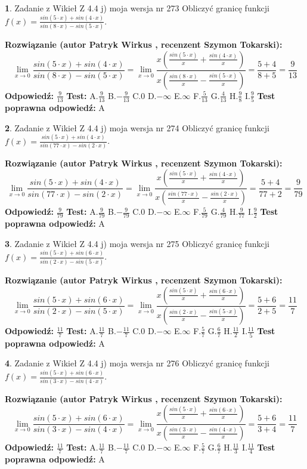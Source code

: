 \documentclass[12pt, a4paper]{article}
\theoremstyle{definition} %
\newtheorem{zad}{}
\newcommand{\zadStart}[1]{\begin{zad}#1\newline}
\newcommand{\zadStop}{\end{zad}}
\newcommand{\rozwStart}[2]{\noindent \textbf{Rozwiązanie (autor #1 , recenzent #2): }\newline}
\newcommand{\rozwStop}{\newline}
\newcommand{\odpStart}{\noindent \textbf{Odpowiedź:}\newline}
\newcommand{\odpStop}{\newline}
\newcommand{\testStart}{\noindent \textbf{Test:}\newline}
\newcommand{\testStop}{\newline}
\newcommand{\kluczStart}{\noindent \textbf{Test poprawna odpowiedź:}\newline}
\newcommand{\kluczStop}{\newline}
\begin{document}
\zadStart{Zadanie z Wikieł Z 4.4 j) moja wersja nr 273}
Obliczyć granicę funkcji $f(x)=\frac{sin(5\cdot x) +sin(4\cdot x)}{sin(8\cdot x) -sin(5\cdot x)}$.
\zadStop
\rozwStart{Patryk Wirkus}{Szymon Tokarski}
$$\lim\limits_{x\to 0}\frac{sin(5\cdot x) +sin(4\cdot x)}{sin(8\cdot x) -sin(5\cdot x)}=\lim\limits_{x\to 0}\frac{x(\frac{sin(5\cdot x)}{x}+\frac{sin(4\cdot x)}{x})}{x(\frac{sin(8\cdot x)}{x}-\frac{sin(5\cdot x)}{x})}=\frac{5+4}{8+5} = \frac{9}{13}$$
\rozwStop
\odpStart
$\frac{9}{13}$
\odpStop
\testStart
A.$\frac{9}{13}$
B.$-\frac{9}{13}$
C.$0$
D.$-\infty$
E.$\infty$
F.$\frac{5}{13}$
G.$\frac{4}{13}$
H.$\frac{9}{8}$
I.$\frac{9}{5}$
\testStop
\kluczStart
A
\kluczStop



\zadStart{Zadanie z Wikieł Z 4.4 j) moja wersja nr 274}
Obliczyć granicę funkcji $f(x)=\frac{sin(5\cdot x) +sin(4\cdot x)}{sin(77\cdot x) -sin(2\cdot x)}$.
\zadStop
\rozwStart{Patryk Wirkus}{Szymon Tokarski}
$$\lim\limits_{x\to 0}\frac{sin(5\cdot x) +sin(4\cdot x)}{sin(77\cdot x) -sin(2\cdot x)}=\lim\limits_{x\to 0}\frac{x(\frac{sin(5\cdot x)}{x}+\frac{sin(4\cdot x)}{x})}{x(\frac{sin(77\cdot x)}{x}-\frac{sin(2\cdot x)}{x})}=\frac{5+4}{77+2} = \frac{9}{79}$$
\rozwStop
\odpStart
$\frac{9}{79}$
\odpStop
\testStart
A.$\frac{9}{79}$
B.$-\frac{9}{79}$
C.$0$
D.$-\infty$
E.$\infty$
F.$\frac{5}{79}$
G.$\frac{4}{79}$
H.$\frac{9}{77}$
I.$\frac{9}{2}$
\testStop
\kluczStart
A
\kluczStop



\zadStart{Zadanie z Wikieł Z 4.4 j) moja wersja nr 275}
Obliczyć granicę funkcji $f(x)=\frac{sin(5\cdot x) +sin(6\cdot x)}{sin(2\cdot x) -sin(5\cdot x)}$.
\zadStop
\rozwStart{Patryk Wirkus}{Szymon Tokarski}
$$\lim\limits_{x\to 0}\frac{sin(5\cdot x) +sin(6\cdot x)}{sin(2\cdot x) -sin(5\cdot x)}=\lim\limits_{x\to 0}\frac{x(\frac{sin(5\cdot x)}{x}+\frac{sin(6\cdot x)}{x})}{x(\frac{sin(2\cdot x)}{x}-\frac{sin(5\cdot x)}{x})}=\frac{5+6}{2+5} = \frac{11}{7}$$
\rozwStop
\odpStart
$\frac{11}{7}$
\odpStop
\testStart
A.$\frac{11}{7}$
B.$-\frac{11}{7}$
C.$0$
D.$-\infty$
E.$\infty$
F.$\frac{5}{7}$
G.$\frac{6}{7}$
H.$\frac{11}{2}$
I.$\frac{11}{5}$
\testStop
\kluczStart
A
\kluczStop



\zadStart{Zadanie z Wikieł Z 4.4 j) moja wersja nr 276}
Obliczyć granicę funkcji $f(x)=\frac{sin(5\cdot x) +sin(6\cdot x)}{sin(3\cdot x) -sin(4\cdot x)}$.
\zadStop
\rozwStart{Patryk Wirkus}{Szymon Tokarski}
$$\lim\limits_{x\to 0}\frac{sin(5\cdot x) +sin(6\cdot x)}{sin(3\cdot x) -sin(4\cdot x)}=\lim\limits_{x\to 0}\frac{x(\frac{sin(5\cdot x)}{x}+\frac{sin(6\cdot x)}{x})}{x(\frac{sin(3\cdot x)}{x}-\frac{sin(4\cdot x)}{x})}=\frac{5+6}{3+4} = \frac{11}{7}$$
\rozwStop
\odpStart
$\frac{11}{7}$
\odpStop
\testStart
A.$\frac{11}{7}$
B.$-\frac{11}{7}$
C.$0$
D.$-\infty$
E.$\infty$
F.$\frac{5}{7}$
G.$\frac{6}{7}$
H.$\frac{11}{3}$
I.$\frac{11}{4}$
\testStop
\kluczStart
A
\kluczStop
\end{document}

